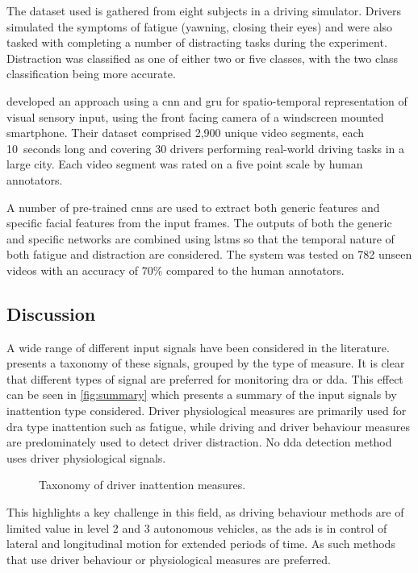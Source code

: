 \documentclass[11pt, parskip=half*,twoside=false]{scrbook}
\begin{document}
The dataset used is gathered from eight subjects in a driving simulator. Drivers simulated the symptoms of fatigue (yawning, closing their eyes) and were also tasked with completing a number of distracting tasks during the experiment. Distraction was classified as one of either two or five classes, with the two class classification being more accurate.

\citet{duaAutoRateHowAttentive2019} developed an approach using a \gls{cnn} and \gls{gru} for spatio-temporal representation of visual sensory input, using the front facing camera of a windscreen mounted smartphone. Their dataset comprised 2,900 unique video segments, each 10~seconds long and covering 30 drivers performing real-world driving tasks in a large city. Each video segment was rated on a five point scale by human annotators. 

A number of pre-trained \glspl{cnn} are used to extract both generic features and specific facial features from the input frames. The outputs of both the generic and specific networks are combined using \glspl{lstm} so that the temporal nature of both fatigue and distraction are considered. The system was tested on 782 unseen videos with an accuracy of $70\%$ compared to the human annotators.

\subsection{Discussion} \label{ssec:analysis}
A wide range of different input signals have been considered in the literature.  presents a taxonomy of these signals, grouped by the type of measure. It is clear that different types of signal are preferred for monitoring \gls{dra} or \gls{dda}. This effect can be seen in \cref{fig:summary} which presents a summary of the input signals by inattention type considered. Driver physiological measures are primarily used for \gls{dra} type inattention such as fatigue, while driving and driver behaviour measures are predominately used to detect driver distraction. No \gls{dda} detection method uses driver physiological signals. 

\begin{figure}[h]
	\centering
	
	\caption{Taxonomy of driver inattention measures.}
	\label{fig:taxonomy_measures}
\end{figure}

This highlights a key challenge in this field, as driving behaviour methods are of limited value in level 2 and 3 autonomous vehicles, as the \gls{ads} is in control of lateral and longitudinal motion for extended periods of time. As such methods that use driver behaviour or physiological measures are preferred.
\end{document}
